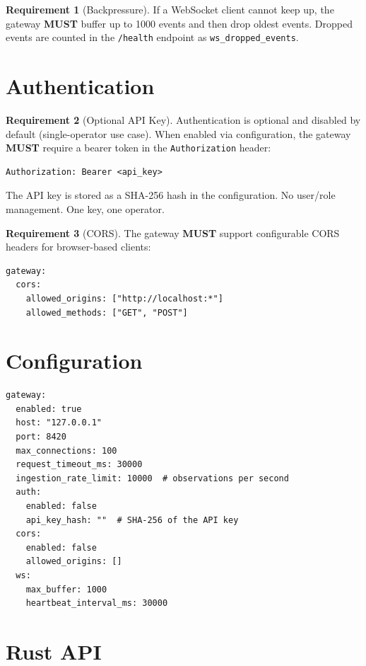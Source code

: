 \documentclass[11pt,a4paper,twoside]{article}
\theoremstyle{definition}
\newtheorem{requirement}{Requirement}[section]
\theoremstyle{plain}
\theoremstyle{remark}
\begin{document}
\begin{requirement}[Backpressure]\label{req:backpressure}
If a WebSocket client cannot keep up, the gateway \textbf{MUST}
buffer up to 1000 events and then drop oldest events. Dropped events
are counted in the \texttt{/health} endpoint as
\texttt{ws\_dropped\_events}.
\end{requirement}


\section{Authentication}\label{sec:gw:auth}

\begin{requirement}[Optional API Key]\label{req:apikey}
Authentication is optional and disabled by default (single-operator
use case). When enabled via configuration, the gateway \textbf{MUST}
require a bearer token in the \texttt{Authorization} header:
\begin{lstlisting}
Authorization: Bearer <api_key>
\end{lstlisting}
The API key is stored as a SHA-256 hash in the configuration. No
user/role management. One key, one operator.
\end{requirement}

\begin{requirement}[CORS]\label{req:cors}
The gateway \textbf{MUST} support configurable CORS headers for
browser-based clients:
\begin{lstlisting}
gateway:
  cors:
    allowed_origins: ["http://localhost:*"]
    allowed_methods: ["GET", "POST"]
\end{lstlisting}
\end{requirement}


\section{Configuration}\label{sec:gw:config}

\begin{lstlisting}[title={Gateway Configuration (in isls config.yaml)}]
gateway:
  enabled: true
  host: "127.0.0.1"
  port: 8420
  max_connections: 100
  request_timeout_ms: 30000
  ingestion_rate_limit: 10000  # observations per second
  auth:
    enabled: false
    api_key_hash: ""  # SHA-256 of the API key
  cors:
    enabled: false
    allowed_origins: []
  ws:
    max_buffer: 1000
    heartbeat_interval_ms: 30000
\end{lstlisting}


\section{Rust API}\label{sec:gw:rustapi}
\end{document}
